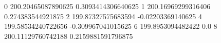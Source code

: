 0 200.20465087890625 0.3093414306640625
1 200.16969299316406 0.274383544921875
2 199.87327575683594 -0.02203369140625
4 199.58534240722656 -0.309967041015625
6 199.8953094482422 0.0
8 200.11129760742188 0.2159881591796875
